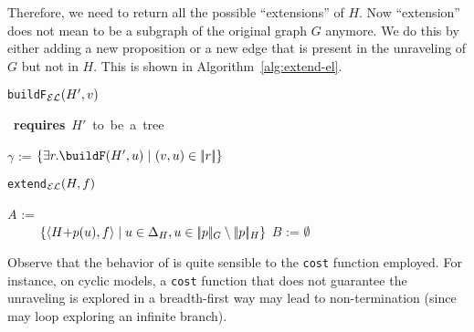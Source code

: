 Therefore, we need  to return all the possible
``extensions'' of $H$. Now ``extension'' does not mean to be a
subgraph of the original graph $G$ anymore. We do this
by either adding a new proposition or a new edge
that is present in the unraveling of $G$ but not in $H$. This is
shown in Algorithm~\ref{alg:extend-el}.
%
\begin{center}\begin{minipage}{5cm}%
\begin{algorithm}[H] \small
{} \caption{\small
\texttt{buildF}$_\mathcal{EL}(H',v)$}\label{alg:build-form-el} \mbox{{\bf
requires} $H'$ to be a tree}

$\gamma$ := $\cset{\exists r.\buildF(H',u) \mid$

\hfill$ (v,u) \in \interp{r}}$\;

\;
\end{algorithm}
\end{minipage}
\begin{minipage}{7cm}%
\begin{algorithm}[H]\small
{} \caption{\small
\texttt{extend}$_\mathcal{EL}(H,f)$}\label{alg:extend-el}

$A$ :=\\
\ \ \ \ \  $\{\langle H {+} p(u),f\rangle \mid u \in \Delta_H, u \in
|\!|p|\!|_G \setminus |\!|p|\!|_H\}$\; $B$ := $\emptyset$\;
  \;
\end{algorithm}
\end{minipage}
\end{center}
%
Observe that the behavior of  is quite sensible
to the {\tt cost}  function employed. For instance, on cyclic models,
a {\tt cost} function that does not guarantee the unraveling is explored in a
breadth-first way may lead to non-termination (since
 may loop exploring an infinite branch).



